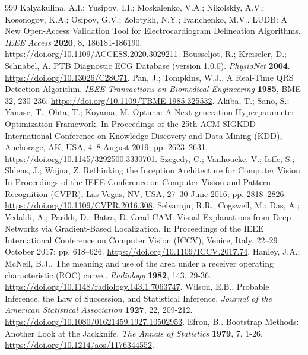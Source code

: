 \documentclass[life,article,submit,moreauthors]{Definitions/mdpi}
\begin{document}
\begin{thebibliography}{999}
Kalyakulina, A.I.; Yusipov, I.I.; Moskalenko, V.A.; Nikolskiy, A.V.; Kosonogov, K.A.; Osipov, G.V.; Zolotykh, N.Y.; Ivanchenko, M.V.. LUDB: A New Open-Access Validation Tool for Electrocardiogram Delineation Algorithms. \emph{IEEE Access} \textbf{2020}, 8, 186181-186190. \url{https://doi.org/10.1109/ACCESS.2020.3029211}.
Bousseljot, R.; Kreiseler, D.; Schnabel, A. PTB Diagnostic ECG Database (version 1.0.0). \emph{PhysioNet} \textbf{2004}. \url{https://doi.org/10.13026/C28C71}.
Pan, J.; Tompkins, W.J.. A Real-Time QRS Detection Algorithm. \emph{IEEE Transactions on Biomedical Engineering} \textbf{1985}, BME-32, 230-236. \url{https://doi.org/10.1109/TBME.1985.325532}.
Akiba, T.; Sano, S.; Yanase, T.; Ohta, T.; Koyama, M.
\newblock Optuna: A Next-generation Hyperparameter Optimization Framework.
\newblock In Proceedings of the 25th ACM SIGKDD International Conference on Knowledge Discovery and Data Mining (KDD), Anchorage, AK, USA, 4--8 August 2019; pp. 2623--2631. \url{https://doi.org/10.1145/3292500.3330701}.
Szegedy, C.; Vanhoucke, V.; Ioffe, S.; Shlens, J.; Wojna, Z.
\newblock Rethinking the Inception Architecture for Computer Vision.
\newblock In Proceedings of the IEEE Conference on Computer Vision and Pattern Recognition (CVPR), Las Vegas, NV, USA, 27--30 June 2016; pp. 2818--2826. \url{https://doi.org/10.1109/CVPR.2016.308}.
Selvaraju, R.R.; Cogswell, M.; Das, A.; Vedaldi, A.; Parikh, D.; Batra, D.
\newblock Grad-CAM: Visual Explanations from Deep Networks via Gradient-Based Localization.
\newblock In Proceedings of the IEEE International Conference on Computer Vision (ICCV), Venice, Italy, 22--29 October 2017; pp. 618--626. \url{https://doi.org/10.1109/ICCV.2017.74}.
Hanley, J.A.; McNeil, B.J.. The meaning and use of the area under a receiver operating characteristic (ROC) curve.. \emph{Radiology} \textbf{1982}, 143, 29-36. \url{https://doi.org/10.1148/radiology.143.1.7063747}.
Wilson, E.B.. Probable Inference, the Law of Succession, and Statistical Inference. \emph{Journal of the American Statistical Association} \textbf{1927}, 22, 209-212. \url{https://doi.org/10.1080/01621459.1927.10502953}.
Efron, B.. Bootstrap Methods: Another Look at the Jackknife. \emph{The Annals of Statistics} \textbf{1979}, 7, 1-26. \url{https://doi.org/10.1214/aos/1176344552}.

\end{thebibliography}
\end{document}
